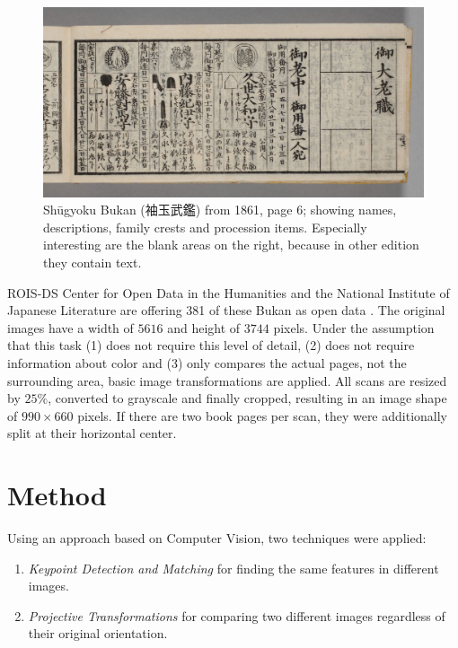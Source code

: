 \documentclass{ltjarticle}
\begin{document}
\begin{figure}
    \centering
    \includegraphics[width=\textwidth]{200019500_00006}
    \caption[Shūgyoku Bukan (袖玉武鑑), page 6]{Shūgyoku Bukan (袖玉武鑑) from 1861, page 6; showing names, descriptions, family crests and procession items. Especially interesting are the blank areas on the right, because in other edition they contain text.}
    \label{fig:shuugyokubukan006}
\end{figure}

ROIS-DS Center for Open Data in the Humanities and the National Institute of Japanese Literature are offering 381 of these Bukan as open data \cite{pmjt}. The original images have a width of $5616$ and height of $3744$ pixels. Under the assumption that this task (1) does not require this level of detail, (2) does not require information about color and (3) only compares the actual pages, not the surrounding area, basic image transformations are applied. All scans are resized by $25\%$, converted to grayscale and finally cropped, resulting in an image shape of $990 \times 660$ pixels. If there are two book pages per scan, they were additionally split at their horizontal center.

\section{Method}

Using an approach based on Computer Vision, two techniques were applied:

\begin{enumerate}
    \item \emph{Keypoint Detection and Matching} for finding the same features in different images.
    \item \emph{Projective Transformations} for comparing two different images regardless of their original orientation.
\end{enumerate}
\end{document}

